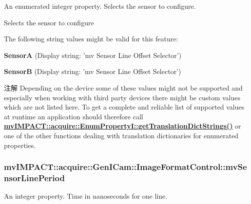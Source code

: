 An enumerated integer property. Selects the sensor to configure. 

Selects the sensor to configure

The following string values might be valid for this feature\+:
\begin{DoxyItemize}
\item {\bfseries Sensor\+A} (Display string\+: 'mv Sensor Line Offset Selector')
\item {\bfseries Sensor\+B} (Display string\+: 'mv Sensor Line Offset Selector')
\end{DoxyItemize}

\begin{DoxyNote}{注解}
Depending on the device some of these values might not be supported and especially when working with third party devices there might be custom values which are not listed here. To get a complete and reliable list of supported values at runtime an application should therefore call {\bfseries \hyperlink{classmv_i_m_p_a_c_t_1_1acquire_1_1_enum_property_i_a0ba6ccbf5ee69784d5d0b537924d26b6}{mv\+I\+M\+P\+A\+C\+T\+::acquire\+::\+Enum\+Property\+I\+::get\+Translation\+Dict\+Strings()}} or one of the other functions dealing with translation dictionaries for enumerated properties. 
\end{DoxyNote}
\hypertarget{classmv_i_m_p_a_c_t_1_1acquire_1_1_gen_i_cam_1_1_image_format_control_ab0faf88fa51cd24bf5e07e234f41a7ab}{
\subsubsection[{mv\+Sensor\+Line\+Period}]{ mv\+I\+M\+P\+A\+C\+T\+::acquire\+::\+Gen\+I\+Cam\+::\+Image\+Format\+Control\+::mv\+Sensor\+Line\+Period}}\label{classmv_i_m_p_a_c_t_1_1acquire_1_1_gen_i_cam_1_1_image_format_control_ab0faf88fa51cd24bf5e07e234f41a7ab}


An integer property. Time in nanoseconds for one line. 

